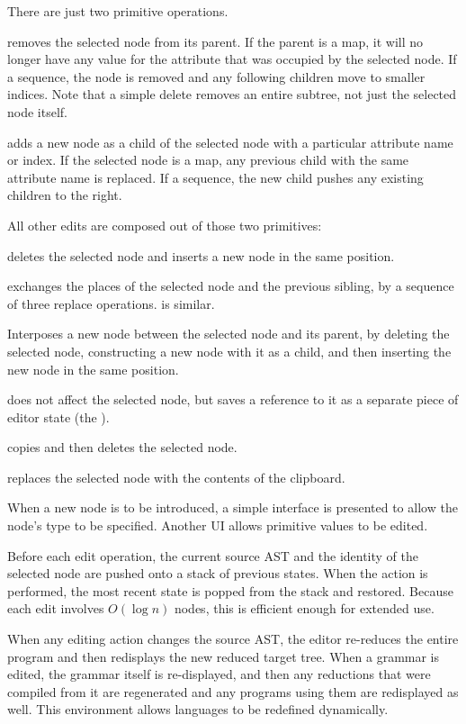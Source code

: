 There are just two primitive operations.

 removes the selected node from its parent. If the parent is a map, it will no longer have any value for the attribute that was occupied by the selected node. If a sequence, the node is removed and any following children move to smaller indices. Note that a simple delete removes an entire subtree, not just the selected node itself.

 adds a new node as a child of the selected node with a particular attribute name or index. If the selected node is a map, any previous child with the same attribute name is replaced. If a sequence, the new child pushes any existing children to the right.

All other edits are composed out of those two primitives:

 deletes the selected node and inserts a new node in the same position.

 exchanges the places of the selected node and the previous sibling, by a sequence of three replace operations.  is similar.

 Interposes a new node between the selected node and its parent, by deleting the selected node, constructing a new node with it as a child, and then inserting the new node in the same position.



 does not affect the selected node, but saves a reference to it as a separate piece of editor state (the ).

 copies and then deletes the selected node.

 replaces the selected node with the contents of the clipboard.

When a new node is to be introduced, a simple interface is presented to allow the node's type to be specified. Another UI allows primitive values to be edited.

Before each edit operation, the current source AST and the identity of the selected node are pushed onto a stack of previous states. When the  action is performed, the most recent state is popped from the stack and restored. Because each edit involves $O(\log n)$ nodes, this is efficient enough for extended use.

When any editing action changes the source AST, the editor re-reduces the entire program and then redisplays the new reduced target tree. When a grammar is edited, the grammar itself is re-displayed, and then any reductions that were compiled from it are regenerated and any programs using them are redisplayed as well. This environment allows languages to be redefined dynamically.

